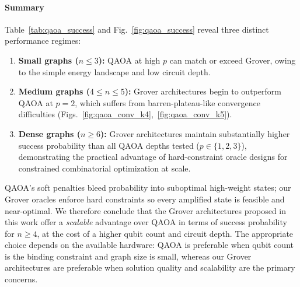 \documentclass{ieeeaccess}
\begin{document}
\paragraph{Summary}
Table~\ref{tab:qaoa_success} and Fig.~\ref{fig:qaoa_success}
reveal three distinct performance regimes:
\begin{enumerate}
    \item \textbf{Small graphs ($n \leq 3$):} QAOA at
    high $p$ can match or exceed Grover, owing to the
    simple energy landscape and low circuit depth.

    \item \textbf{Medium graphs ($4 \leq n \leq 5$):}
    Grover architectures begin to outperform QAOA at
    $p = 2$, which suffers from barren-plateau-like
    convergence difficulties
    (Figs.~\ref{fig:qaoa_conv_k4},~\ref{fig:qaoa_conv_k5}).

    \item \textbf{Dense graphs ($n \geq 6$):} Grover
    architectures maintain substantially higher success
    probability than all QAOA depths tested
    ($p \in \{1,2,3\}$), demonstrating the practical
    advantage of hard-constraint oracle designs for
    constrained combinatorial optimization at scale.
\end{enumerate}

QAOA's soft penalties bleed probability into suboptimal
high-weight states; our Grover oracles enforce hard
constraints so every amplified state is feasible and
near-optimal. We therefore conclude that the Grover
architectures proposed in this work offer a
\emph{scalable} advantage over QAOA in terms of success
probability for $n \geq 4$, at the cost of a higher qubit
count and circuit depth. The appropriate choice depends on
the available hardware: QAOA is preferable when qubit
count is the binding constraint and graph size is small,
whereas our Grover architectures are preferable when
solution quality and scalability are the primary concerns.
\end{document}
